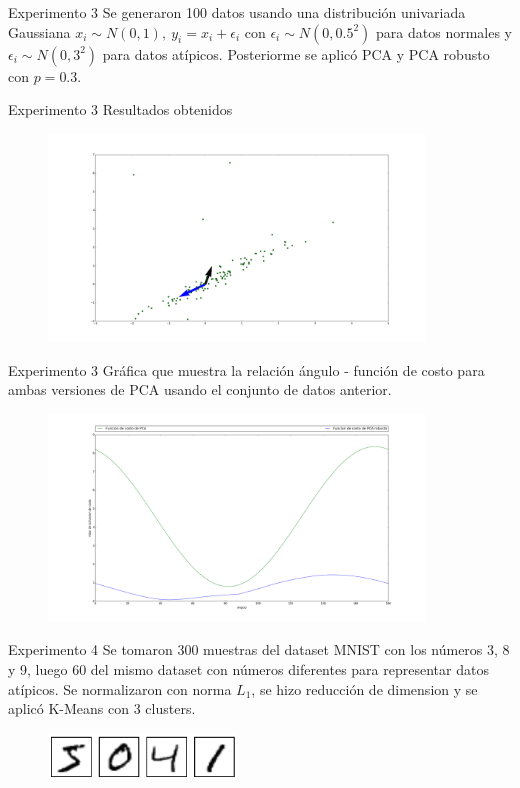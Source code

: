 \documentclass{beamer}
\begin{document}
\begin{frame}{Experimento 3}
	Se generaron 100 datos usando una distribución univariada Gaussiana $x_i \sim N(0, 1),\ y_i = x_i + \epsilon_i$ con $\epsilon_i \sim N(0, 0.5^2)$ para datos normales y $\epsilon_i \sim N(0, 3^2)$ para datos atípicos. Posteriorme se aplicó PCA y PCA robusto con $p = 0.3$.
\end{frame}


\begin{frame}{Experimento 3}
	Resultados obtenidos
	\begin{figure}
		\includegraphics[width=10cm]{GPCA3.png}
	\end{figure}
\end{frame}


\begin{frame}{Experimento 3}
	Gráfica que muestra la relación ángulo - función de costo para ambas versiones de PCA usando el conjunto de datos anterior.
	\begin{figure}
		\includegraphics[width=10cm]{CostF.png}
	\end{figure}
\end{frame}

\begin{frame}{Experimento 4}
	Se tomaron 300 muestras del dataset MNIST con los números 3, 8 y 9, luego 60 del mismo dataset con números diferentes para representar datos atípicos. Se normalizaron con norma $L_1$, se hizo reducción de dimension y se aplicó K-Means con 3 clusters.
	\begin{figure}
		\includegraphics[width=5cm]{MNIST.png}
	\end{figure}
\end{frame}
\end{document}
